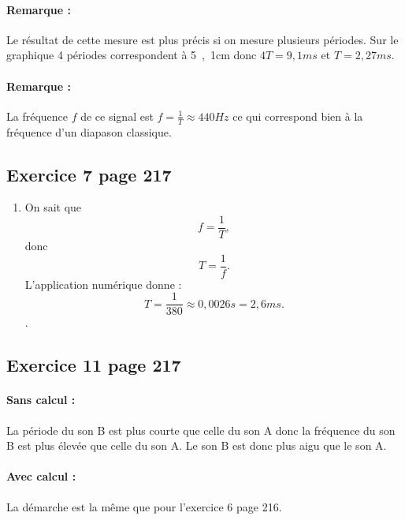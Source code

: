 \documentclass[12pt,a4paper,fleqn]{article}
\begin{document}
\paragraph{Remarque :} Le résultat de cette mesure est plus précis si on mesure plusieurs périodes. Sur le graphique 4 périodes correspondent à \unit{5{,}1}{cm} donc $4T=\unit{9{,}1}{ms}$ et $T=\unit{2{,}27}{ms}$.

\paragraph{Remarque :} La fréquence $f$ de ce signal est $f=\frac{1}{T} \approx \unit{440}{Hz}$ ce qui correspond bien à la fréquence d'un diapason classique.

\subsection*{Exercice 7 page 217}

\begin{enumerate}
\item On sait que 
\[f = \frac{1}{T},\]
donc 
\[T = \frac{1}{f}.\]
L'application numérique donne :
\[T = \frac{1}{380} \approx \unit{0{,}0026}{s} = \unit{2{,}6}{ms} . \].
\end{enumerate}

\subsection*{Exercice 11 page 217}

\paragraph{Sans calcul :}
La période du son B est plus courte que celle du son A donc la fréquence du son B est plus élevée que celle du son A.
Le son B est donc plus aigu que le son A.

\paragraph{Avec calcul :}
La démarche est la même que pour l'exercice 6 page 216.
\end{document}
